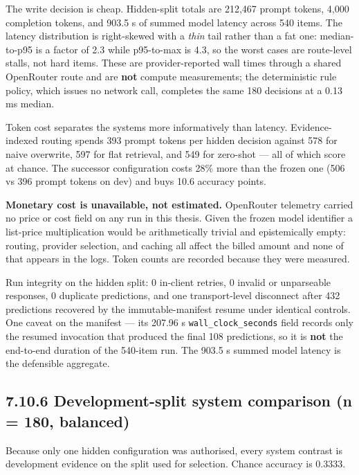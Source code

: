 The write decision is cheap. Hidden-split totals are 212,467 prompt
tokens, 4,000 completion tokens, and 903.5 s of summed model latency
across 540 items. The latency distribution is right-skewed with a
\emph{thin} tail rather than a fat one: median-to-p95 is a factor of 2.3
while p95-to-max is 4.3, so the worst cases are route-level stalls, not
hard items. These are provider-reported wall times through a shared
OpenRouter route and are \textbf{not} compute measurements; the
deterministic rule policy, which issues no network call, completes the
same 180 decisions at a 0.13 ms median.

Token cost separates the systems more informatively than latency.
Evidence-indexed routing spends 393 prompt tokens per hidden decision
against 578 for naive overwrite, 597 for flat retrieval, and 549 for
zero-shot --- all of which score at chance. The successor configuration
costs 28\% more than the frozen one (506 vs 396 prompt tokens on dev)
and buys 10.6 accuracy points.

\textbf{Monetary cost is unavailable, not estimated.} OpenRouter
telemetry carried no price or cost field on any run in this thesis.
Given the frozen model identifier a list-price multiplication would be
arithmetically trivial and epistemically empty: routing, provider
selection, and caching all affect the billed amount and none of that
appears in the logs. Token counts are recorded because they were
measured.

Run integrity on the hidden split: 0 in-client retries, 0 invalid or
unparseable responses, 0 duplicate predictions, and one transport-level
disconnect after 432 predictions recovered by the immutable-manifest
resume under identical controls. One caveat on the manifest --- its
207.96 s \texttt{wall\_clock\_seconds} field records only the resumed
invocation that produced the final 108 predictions, so it is
\textbf{not} the end-to-end duration of the 540-item run. The 903.5 s
summed model latency is the defensible aggregate.

\subsection{7.10.6 Development-split system comparison (n = 180,
balanced)}\label{development-split-system-comparison-n-180-balanced}

Because only one hidden configuration was authorised, every system
contrast is development evidence on the split used for selection. Chance
accuracy is 0.3333.


